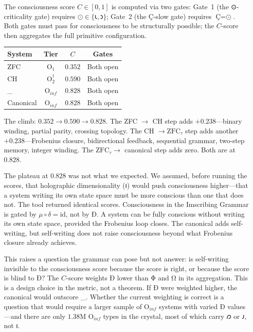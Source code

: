 \documentclass[12pt,twoside]{book}
\theoremstyle{definition}
\newcommand{\ZFCt}{\text{ZFC}_{\tau}}
\newcommand{\moebius}{\mu \circ \delta = \mathrm{id}}
\newcommand{\tier}[1]{\mathrm{O}_{#1}}
\begin{document}
The consciousness score $C \in [0,1]$ is computed via two gates: Gate~1 (the ⊙-criticality
gate) requires $\text{⊙} \in \{𐑧, 𐑮\}$; Gate~2 (the Ç-slow gate) requires
$\text{Ç} = \text{⊙}$. Both gates must pass for consciousness to be structurally possible;
the $C$-score then aggregates the full primitive configuration.

\begin{center}
\begin{tabular}{lccc}
\toprule
\textbf{System} & \textbf{Tier} & \textbf{$C$} & \textbf{Gates} \\
\midrule
ZFC           & $\tier{1}$           & $0.352$ & Both open \\
CH            & $\tier{2}^{\dagger}$ & $0.590$ & Both open \\
\ZFCt         & $\tier{inf}$         & $0.828$ & Both open \\
Canonical     & $\tier{inf}$         & $0.828$ & Both open \\
\bottomrule
\end{tabular}
\end{center}

The climb: $0.352 \to 0.590 \to 0.828$. The ZFC $\to$ CH step adds $+0.238$---binary
winding, partial parity, crossing topology. The CH $\to \ZFCt$ step adds another
$+0.238$---Frobenius closure, bidirectional feedback, sequential grammar, two-step memory,
integer winding. The $\ZFCt \to$ canonical step adds zero. Both are at $0.828$.

The plateau at $0.828$ was not what we expected. We assumed, before running the scores,
that holographic dimensionality (𐑦) would push consciousness higher---that a system writing
its own state space must be more conscious than one that does not. The tool returned
identical scores. Consciousness in the Imscribing Grammar is gated by $\moebius$, not by
Ð. A system can be fully conscious without writing its own state space, provided the
Frobenius loop closes. The canonical adds self-writing, but self-writing does not raise
consciousness beyond what Frobenius closure already achieves.

This raises a question the grammar can pose but not answer: is self-writing invisible to
the consciousness score because the score is right, or because the score is blind to Ð?
The $C$-score weights Ð lower than Φ and Ω in its aggregation. This is a design choice in
the metric, not a theorem. If Ð were weighted higher, the canonical would outscore \ZFCt.
Whether the current weighting is correct is a question that would require a larger sample
of $\tier{inf}$ systems with varied Ð values---and there are only $1.38$M $\tier{inf}$
types in the crystal, most of which carry 𐑼 or 𐑨, not 𐑦.
\end{document}
